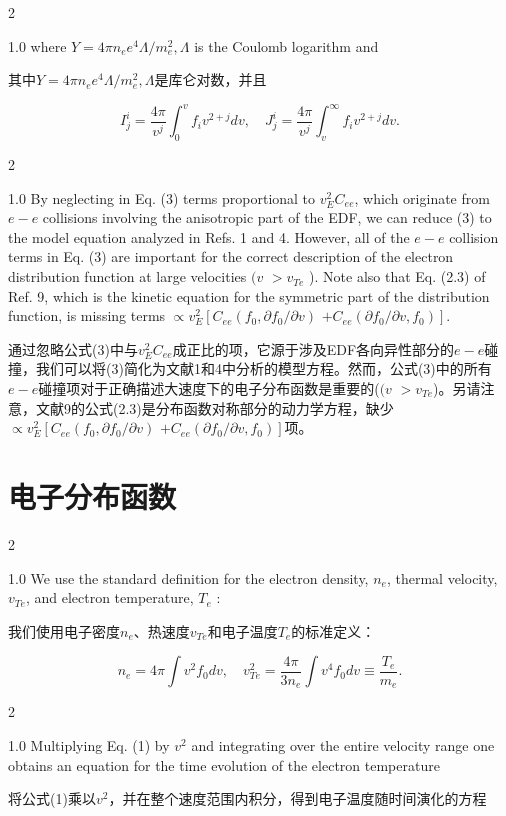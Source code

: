 \documentclass[oneside,onecolumn]{article}
\newcommand\enzhbox[2]{
	\quad\par \begin{paracol}{2} 
			\begin{spacing}{1.0}
					\footnotesize  #1
			\end{spacing}
			
		\switchcolumn[1] 
		#2
	\end{paracol} 
}
\begin{document}
\begin{sloppypar}
  

\enzhbox{  where $Y=4 \pi n_{e} e^{4} \Lambda / m_{e}^{2}, \Lambda$ is the Coulomb logarithm and
}{
其中$Y=4 \pi n_{e} e^{4} \Lambda / m_{e}^{2}, \Lambda$是库仑对数，并且
}
  
  \begin{equation*}
  I_{j}^{i}=\frac{4 \pi}{v^{j}} \int_{0}^{v} f_{i} v^{2+j} d v, \quad J_{j}^{i}=\frac{4 \pi}{v^{j}} \int_{v}^{\infty} f_{i} v^{2+j} d v .
  \end{equation*}
  

\enzhbox{  By neglecting in Eq. (3) terms proportional to $v_{E}^{2} C_{e e}$, which originate from $e-e$ collisions involving the anisotropic part of the EDF, we can reduce (3) to the model equation analyzed in Refs. 1 and 4. However, all of the $e-e$ collision terms in Eq. (3) are important for the correct description of the electron distribution function at large velocities $(v$ $>v_{T e}$ ). Note also that Eq. (2.3) of Ref. 9, which is the kinetic equation for the symmetric part of the distribution function, is missing terms $\propto v_{E}^{2}\left[C_{e e}\left(f_{0}, \partial f_{0} / \partial v\right)\right.$ $\left.+C_{e e}\left(\partial f_{0} / \partial v, f_{0}\right)\right]$.
}{
通过忽略公式(3)中与$v_{E}^{2} C_{e e}$成正比的项，它源于涉及EDF各向异性部分的$e-e$碰撞，我们可以将(3)简化为文献1和4中分析的模型方程。然而，公式(3)中的所有$e-e$碰撞项对于正确描述大速度下的电子分布函数是重要的($(v$ $>v_{T e}$)。另请注意，文献9的公式(2.3)是分布函数对称部分的动力学方程，缺少$\propto v_{E}^{2}\left[C_{e e}\left(f_{0}, \partial f_{0} / \partial v\right)\right.$ $\left.+C_{e e}\left(\partial f_{0} / \partial v, f_{0}\right)\right]$项。
}
  
  \section{电子分布函数}

\enzhbox{  We use the standard definition for the electron density, $n_{e}$, thermal velocity, $v_{T e}$, and electron temperature, $T_{e}$ :
}{
我们使用电子密度$n_{e}$、热速度$v_{T e}$和电子温度$T_{e}$的标准定义：
}
  
  \begin{equation}
  n_{e}=4 \pi \int v^{2} f_{0} d v, \quad v_{T e}^{2}=\frac{4 \pi}{3 n_{e}} \int v^{4} f_{0} d v \equiv \frac{T_{e}}{m_{e}} .
  \end{equation}
  

\enzhbox{  Multiplying Eq. (1) by $v^{2}$ and integrating over the entire velocity range one obtains an equation for the time evolution of the electron temperature
}{
将公式(1)乘以$v^{2}$，并在整个速度范围内积分，得到电子温度随时间演化的方程
}
  

\end{sloppypar}
\end{document}
